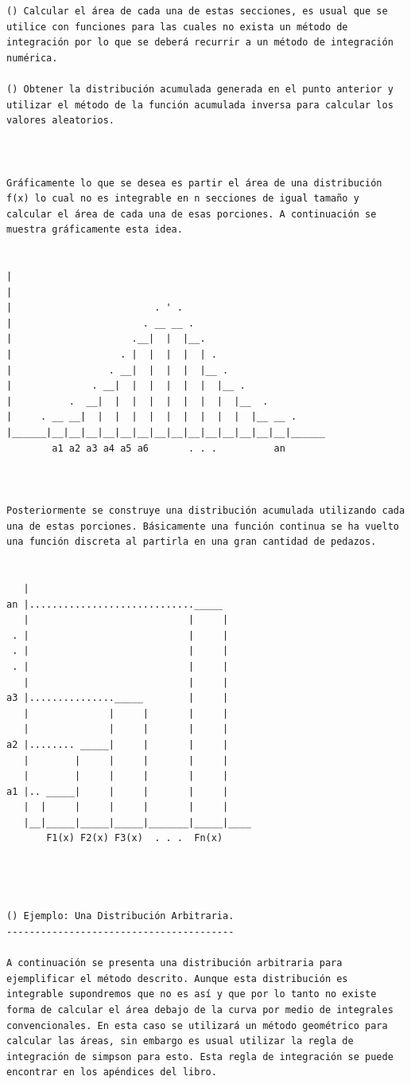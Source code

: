 \begin{verbatim}
() Calcular el área de cada una de estas secciones, es usual que se utilice con funciones para las cuales no exista un método de integración por lo que se deberá recurrir a un método de integración numérica.

() Obtener la distribución acumulada generada en el punto anterior y utilizar el método de la función acumulada inversa para calcular los valores aleatorios.



Gráficamente lo que se desea es partir el área de una distribución f(x) lo cual no es integrable en n secciones de igual tamaño y calcular el área de cada una de esas porciones. A continuación se muestra gráficamente esta idea.


|
|                           
|                         . ' .
|                       . __ __ .
|                     .__|  |  |__.
|                   . |  |  |  |  | .
|                 . __|  |  |  |  |__ .
|              . __|  |  |  |  |  |  |__ .
|          .  __|  |  |  |  |  |  |  |  |__  .
|     . __ __|  |  |  |  |  |  |  |  |  |  |__ __ .
|______|__|__|__|__|__|__|__|__|__|__|__|__|__|__|______
        a1 a2 a3 a4 a5 a6       . . .          an



Posteriormente se construye una distribución acumulada utilizando cada una de estas porciones. Básicamente una función continua se ha vuelto una función discreta al partirla en una gran cantidad de pedazos.


   |
an |............................._____
   |                            |     |
 . |                            |     |
 . |                            |     |
 . |                            |     |
   |                            |     |
a3 |..............._____        |     |
   |              |     |       |     |
   |              |     |       |     |
a2 |........ _____|     |       |     |
   |        |     |     |       |     |
   |        |     |     |       |     |
a1 |.. _____|     |     |       |     |
   |  |     |     |     |       |     |
   |__|_____|_____|_____|_______|_____|____
       F1(x) F2(x) F3(x)  . . .  Fn(x)




() Ejemplo: Una Distribución Arbitraria.
----------------------------------------

A continuación se presenta una distribución arbitraria para ejemplificar el método descrito. Aunque esta distribución es integrable supondremos que no es así y que por lo tanto no existe forma de calcular el área debajo de la curva por medio de integrales convencionales. En esta caso se utilizará un método geométrico para calcular las áreas, sin embargo es usual utilizar la regla de integración de simpson para esto. Esta regla de integración se puede encontrar en los apéndices del libro.



\end{verbatim}
